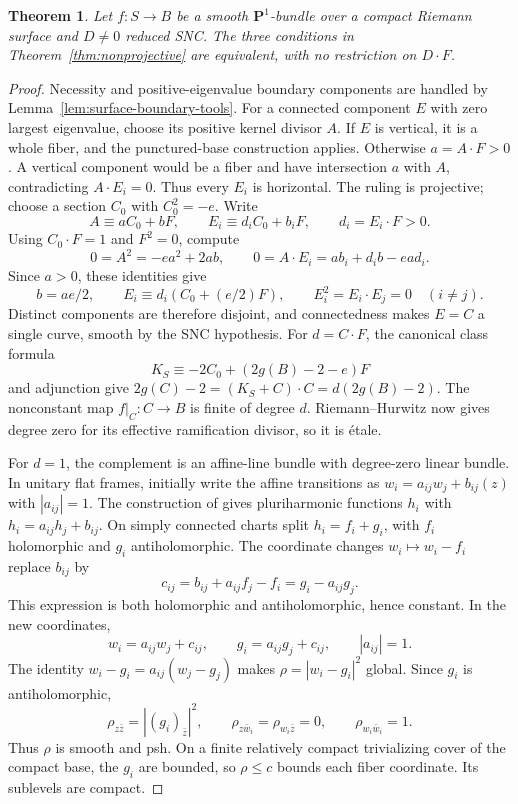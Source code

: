 \documentclass[11pt]{amsart}
\newtheorem{theorem}{Theorem}[section]
\theoremstyle{definition}
\theoremstyle{remark}
\numberwithin{equation}{section}
\newcommand{\PP}{\mathbf P}
\begin{document}
\begin{theorem}\label{cor:ruled-all-degrees}
Let $f:S\to B$ be a smooth $\PP^1$-bundle over a compact Riemann
surface and $D\ne0$ reduced SNC. The three conditions in
Theorem~\ref{thm:nonprojective} are equivalent, with no restriction
on $D\cdot F$.
\end{theorem}
\begin{proof}
Necessity and positive-eigenvalue boundary components are handled
by Lemma~\ref{lem:surface-boundary-tools}. For a connected component
$E$ with zero largest eigenvalue, choose its positive kernel divisor
$A$. If $E$ is vertical, it is a whole fiber, and the punctured-base
construction applies. Otherwise $a=A\cdot F>0$. A vertical
component would be a fiber and have intersection $a$ with $A$,
contradicting $A\cdot E_i=0$. Thus every $E_i$ is horizontal.
The ruling is projective; choose a section $C_0$ with $C_0^2=-e$.
Write
\[
 A\equiv aC_0+bF,\qquad E_i\equiv d_iC_0+b_iF,
 \qquad d_i=E_i\cdot F>0.
\]
Using $C_0\cdot F=1$ and $F^2=0$, compute
\[
 0=A^2=-ea^2+2ab,\qquad
 0=A\cdot E_i=a b_i+d_i b-ea d_i.
\]
Since $a>0$, these identities give
\[
 b=ae/2,\qquad E_i\equiv d_i(C_0+(e/2)F),\qquad
 E_i^2=E_i\cdot E_j=0\quad(i\ne j).
\]
Distinct components are therefore disjoint, and connectedness makes
$E=C$ a single curve, smooth by the SNC hypothesis. For
$d=C\cdot F$, the canonical class formula
\[
 K_S\equiv-2C_0+(2g(B)-2-e)F
\]
and adjunction give $2g(C)-2=(K_S+C)\cdot C=d(2g(B)-2)$.
The nonconstant map $f|_C:C\to B$ is finite of degree $d$.
Riemann--Hurwitz now gives degree zero for its effective ramification
divisor, so it is \'etale.

For $d=1$, the complement is an affine-line bundle with degree-zero
linear bundle. In unitary flat frames, initially write the affine
transitions as $w_i=a_{ij}w_j+b_{ij}(z)$ with $|a_{ij}|=1$.
The construction of \cite[Proposition~2.1]{KoikeUeda2025} gives
pluriharmonic functions $h_i$ with
$h_i=a_{ij}h_j+b_{ij}$. On simply connected charts split
$h_i=f_i+g_i$, with $f_i$ holomorphic and $g_i$ antiholomorphic.
The coordinate changes $w_i\mapsto w_i-f_i$ replace $b_{ij}$ by
\[
 c_{ij}=b_{ij}+a_{ij}f_j-f_i=g_i-a_{ij}g_j.
\]
This expression is both holomorphic and antiholomorphic, hence
constant. In the new coordinates,
\[
 w_i=a_{ij}w_j+c_{ij},\qquad g_i=a_{ij}g_j+c_{ij},
 \qquad |a_{ij}|=1.
\]
The identity $w_i-g_i=a_{ij}(w_j-g_j)$ makes
$\rho=|w_i-g_i|^2$ global. Since $g_i$ is antiholomorphic,
\[
 \rho_{z\bar z}=|(g_i)_{\bar z}|^2,\qquad
 \rho_{z\bar w_i}=\rho_{w_i\bar z}=0,\qquad
 \rho_{w_i\bar w_i}=1.
\]
Thus $\rho$ is smooth and psh. On a finite relatively compact
trivializing cover of the compact base, the $g_i$ are bounded, so
$\rho\le c$ bounds each fiber coordinate. Its sublevels are compact.


\end{proof}
\end{document}

